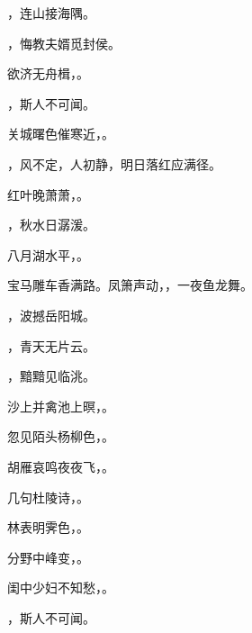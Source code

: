 \documentclass[12pt, a4paper, addpoints]{exam}
\begin{document}
\begin{questions}
\question[1] \uline{\qquad\qquad\qquad}，连山接海隅。

\question[1] \uline{\qquad\qquad\qquad}，悔教夫婿觅封侯。

\question[1] 欲济无舟楫，\uline{\qquad\qquad\qquad}。

\question[1] \uline{\qquad\qquad\qquad}，斯人不可闻。

\question[1] 关城曙色催寒近，\uline{\qquad\qquad\qquad}。

\question[1] \uline{\qquad\qquad\qquad}，风不定，人初静，明日落红应满径。

\question[1] 红叶晚萧萧，\uline{\qquad\qquad\qquad}。

\question[1] \uline{\qquad\qquad\qquad}，秋水日潺湲。

\question[1] 八月湖水平，\uline{\qquad\qquad\qquad}。

\question[1] 宝马雕车香满路。凤箫声动，\uline{\qquad\qquad\qquad}，一夜鱼龙舞。

\question[1] \uline{\qquad\qquad\qquad}，波撼岳阳城。

\question[1] \uline{\qquad\qquad\qquad}，青天无片云。

\question[1] \uline{\qquad\qquad\qquad}，黯黯见临洮。

\question[1] 沙上并禽池上暝，\uline{\qquad\qquad\qquad}。

\question[1] 忽见陌头杨柳色，\uline{\qquad\qquad\qquad}。

\question[1] 胡雁哀鸣夜夜飞，\uline{\qquad\qquad\qquad}。

\question[1] 几句杜陵诗，\uline{\qquad\qquad\qquad}。

\question[1] 林表明霁色，\uline{\qquad\qquad\qquad}。

\question[1] 分野中峰变，\uline{\qquad\qquad\qquad}。

\question[1] 闺中少妇不知愁，\uline{\qquad\qquad\qquad}。

\question[1] \uline{\qquad\qquad\qquad}，斯人不可闻。

\end{questions}

\hspace{5cm}
\end{document}
